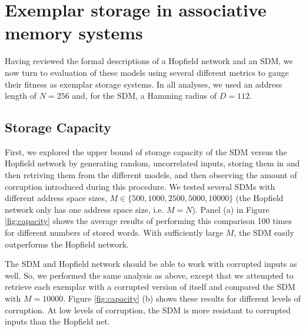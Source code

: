 \documentclass[10pt,letterpaper]{article}
\begin{document}
\section{Exemplar storage in associative memory systems}

Having reviewed the formal descriptions of a Hopfield network and an
SDM, we now turn to evaluation of these models using several different
metrics to gauge their fitness as exemplar storage systems. In all
analyses, we used an address length of $N=256$ and, for the SDM, a
Hamming radius of $D=112$.

\subsection{Storage Capacity}

First, we explored the upper bound of storage capacity of the SDM
versus the Hopfield network by generating random, uncorrelated inputs,
storing them in and then retriving them from the different models, and
then observing the amount of corruption introduced during this
procedure. We tested several SDMs with different address space sizes,
$M\in\{500, 1000, 2500, 5000, 10000\}$ (the Hopfield network only has
one address space size, i.e. $M=N$).  Panel (a) in Figure
\ref{fig:capacity} shows the average results of performing this
comparison 100 times for different numbers of stored words. With
sufficiently large $M$, the SDM easily outperforms the Hopfield
network.

The SDM and Hopfield network should be able to work with corrupted
inputs as well. So, we performed the same analysis as above, except
that we attempted to retrieve each exemplar with a corrupted version
of itself and compared the SDM with $M=10000$.  Figure
\ref{fig:capacity} (b) shows these results for different levels of
corruption. At low levels of corruption, the SDM is more resistant to
corrupted inputs than the Hopfield net.
\end{document}
